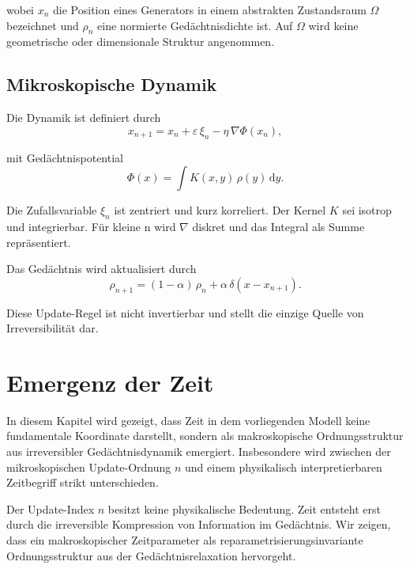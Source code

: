 \documentclass[11pt,a4paper]{article}
\renewcommand{\dd}{\mathrm{d}}
\begin{document}
wobei $x_n$ die Position eines Generators in einem abstrakten Zustandsraum $\Omega$ bezeichnet und $\rho_n$ eine normierte Gedächtnisdichte ist. Auf $\Omega$ wird keine geometrische oder dimensionale Struktur angenommen.

\subsection{Mikroskopische Dynamik}

Die Dynamik ist definiert durch
\begin{equation}
 x_{n+1} = x_n + \varepsilon \, \xi_n - \eta \, \nabla \Phi(x_n),
\end{equation}

mit Gedächtnispotential
\begin{equation}
 \Phi(x) = \int K(x,y)\, \rho(y)\, \dd y.
\end{equation}

Die Zufallsvariable $\xi_n$ ist zentriert und kurz korreliert. Der Kernel $K$ sei isotrop und integrierbar. Für kleine n wird $\nabla$ diskret und das Integral als Summe repräsentiert.

Das Gedächtnis wird aktualisiert durch
\begin{equation}
 \rho_{n+1} = (1-\alpha)\, \rho_n + \alpha \, \delta(x-x_{n+1}).
\end{equation}

Diese Update-Regel ist nicht invertierbar und stellt die einzige Quelle von Irreversibilität dar.

\section{Emergenz der Zeit}

In diesem Kapitel wird gezeigt, dass Zeit in dem vorliegenden Modell keine fundamentale Koordinate darstellt, sondern als makroskopische Ordnungsstruktur aus irreversibler Gedächtnisdynamik emergiert. Insbesondere wird zwischen der mikroskopischen Update-Ordnung $n$ und einem physikalisch interpretierbaren Zeitbegriff strikt unterschieden.

Der Update-Index $n$ besitzt keine physikalische Bedeutung. Zeit entsteht erst durch die irreversible Kompression von Information im Gedächtnis. Wir zeigen, dass ein makroskopischer Zeitparameter als reparametrisierungsinvariante Ordnungsstruktur aus der Gedächtnisrelaxation hervorgeht.

\end{document}
